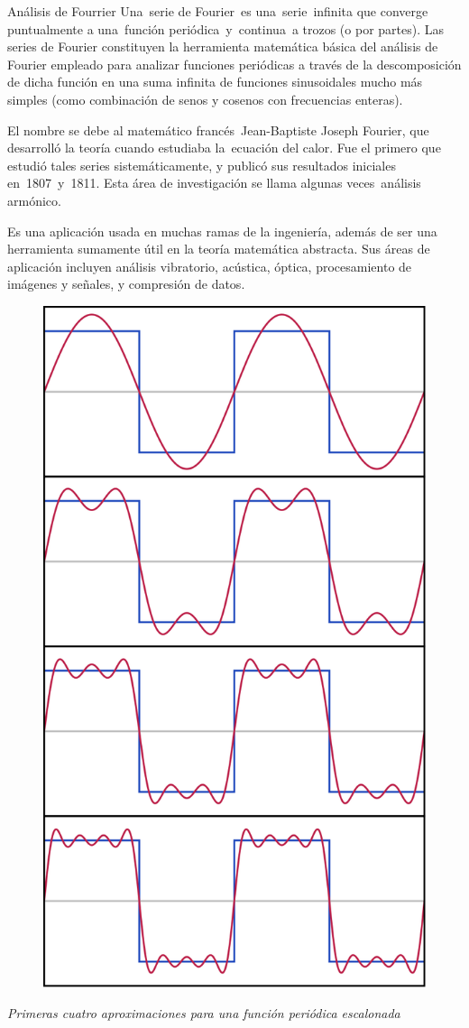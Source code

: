 \newpage
\begin{myblock}{Análisis de Fourrier}
Una serie de Fourier es una serie infinita que converge puntualmente a una función periódica y continua a trozos (o por partes). Las series de Fourier constituyen la herramienta matemática básica del análisis de Fourier empleado para analizar funciones periódicas a través de la descomposición de dicha función en una suma infinita de funciones sinusoidales mucho más simples (como combinación de senos y cosenos con frecuencias enteras). 

\vspace{2mm} El nombre se debe al matemático francés Jean-Baptiste Joseph Fourier, que desarrolló la teoría cuando estudiaba la ecuación del calor. Fue el primero que estudió tales series sistemáticamente, y publicó sus resultados iniciales en 1807 y 1811. Esta área de investigación se llama algunas veces análisis armónico.

\vspace{2mm} Es una aplicación usada en muchas ramas de la ingeniería, además de ser una herramienta sumamente útil en la teoría matemática abstracta. Sus áreas de aplicación incluyen análisis vibratorio, acústica, óptica, procesamiento de imágenes y señales, y compresión de datos.


\begin{figure}[H]
		\centering
		\includegraphics[width=.5\textwidth]{imagenes/imagenes20/T20IM12.png}
	\end{figure}
\emph{Primeras cuatro aproximaciones para una función periódica escalonada}
\end{myblock}




 